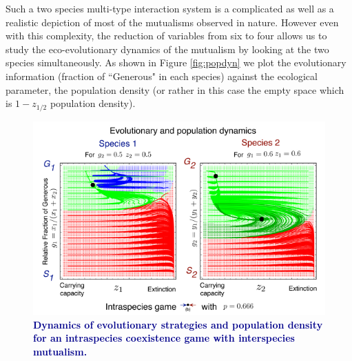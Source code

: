 \documentclass{pnastwo}
\newcommand{\cha}[1]{\textcolor{darkblue}{#1}}
\begin{document}
\begin{article}
Such a two species multi-type interaction system is a complicated as well as a realistic depiction of most of the mutualisms observed in nature.
However even with this complexity, the reduction of variables from six to four allows us to study the eco-evolutionary dynamics of the mutualism by looking at the two species simultaneously.
As shown in Figure \ref{fig:popdyn} we plot the evolutionary information (fraction of ``Generous" in each species) against the ecological parameter, the population density (or rather in this case the empty space which is $1-z_{1/2}$ population density).

\begin{figure}[h]
\begin{center}
\includegraphics[width=2\columnwidth]{../Figures/mainexamplepopdyn2.pdf}
\caption{
\cha{\textbf{Dynamics of evolutionary strategies and population density for an intraspecies coexistence game with interspecies mutualism.}
}
}
\end{center}
\end{figure}



\end{article}
\end{document}
